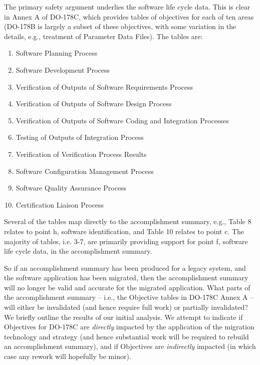\documentclass{llncs}
\begin{document}
The primary safety argument underlies the software life cycle data. This is clear in Annex A of DO-178C, which provides tables of objectives for each of ten areas (DO-178B is largely a subset of these objectives, with some variation in the details, e.g., treatment of Parameter Data Files). The tables are:
\begin{enumerate}
\item Software Planning Process
\item Software Development Process
\item Verification of Outputs of Software Requirements Process
\item Verification of Outputs of Software Design Process
\item Verification of Outputs of Software Coding and Integration Processes
\item Testing of Outputs of Integration Process 
\item Verification of Verification Process Results
\item Software Configuration Management Process
\item Software Quality Assurance Process
\item Certification Liaison Process
\end{enumerate}

Several of the tables map directly to the accomplishment summary, e.g., Table 8 relates to point h, software identification, and Table 10 relates to point c. The majority of tables, i.e. 3-7, are primarily providing support for point f, software life cycle data, in the accomplishment summary. 

So if an accomplishment summary has been produced for a legacy system, and the software application has been migrated, then the accomplishment summary will no longer be valid and accurate for the migrated application. What parts of the accomplishment summary -- i.e., the Objective tables in DO-178C Annex A -- will either be invalidated (and hence require full work) or partially invalidated? We briefly outline the results of our initial analysis. We attempt to indicate if Objectives for DO-178C are \textit{directly} impacted by the application of the migration technology and strategy (and hence substantial work will be required to rebuild an accomplishment summary), and if Objectives are \textit{indirectly} impacted (in which case any rework will hopefully be minor). 
\end{document}
